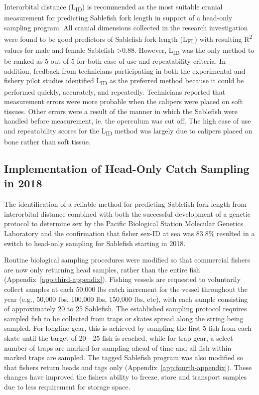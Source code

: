 \documentclass[12pt]{article}\usepackage[]{graphicx}\usepackage[]{color}
\begin{document}
Interorbital distance (L\textsubscript{ID}) is recommended as the most suitable cranial measurement for predicting Sablefish fork length in support of a head-only sampling program. All cranial dimensions collected in the research investigation were found to be good predictors of Sablefish fork length (L\textsubscript{FL}) with resulting R\textsuperscript{2} values for male and female Sablefish \textgreater0.88. However, L\textsubscript{ID} was the only method to be ranked as 5 out of 5 for both ease of use and repeatability criteria. In addition, feedback from technicians participating in both the experimental and fishery pilot studies identified L\textsubscript{ID} as the preferred method because it could be performed quickly, accurately, and repeatedly. Technicians reported that measurement errors were more probable when the calipers were placed on soft tissues. Other errors were a result of the manner in which the Sablefish were handled before measurement, ie. the operculum was cut off. The high ease of use and repeatability scores for the L\textsubscript{ID} method was largely due to calipers placed on bone rather than soft tissue.

\hypertarget{implementation-of-head-only-catch-sampling-in-2018}{%
\subsection{Implementation of Head-Only Catch Sampling in 2018}\label{implementation-of-head-only-catch-sampling-in-2018}}

The identification of a reliable method for predicting Sablefish fork length from interorbital distance combined with both the successful development of a genetic protocol to determine sex by the Pacific Biological Station Molecular Genetics Laboratory and the confirmation that fisher sex-ID at sea was 83.8\% resulted in a switch to head-only sampling for Sablefish starting in 2018.

Routine biological sampling procedures were modified so that commercial fishers are now only returning head samples, rather than the entire fish (Appendix~\ref{app:third-appendix}). Fishing vessels are requested to voluntarily collect samples at each 50,000 lbs catch increment for the vessel throughout the year (e.g., 50,000 lbs, 100,000 lbs, 150,000 lbs, etc), with each sample consisting of approximately 20 to 25 Sablefish. The established sampling protocol requires sampled fish to be collected from traps or skates spread along the string being sampled. For longline gear, this is achieved by sampling the first 5 fish from each skate until the target of 20 - 25 fish is reached, while for trap gear, a select number of traps are marked for sampling ahead of time and all fish within marked traps are sampled. The tagged Sablefish program was also modified so that fishers return heads and tags only (Appendix~\ref{app:fourth-appendix}). These changes have improved the fishers ability to freeze, store and transport samples due to less requirement for storage space.
\end{document}
